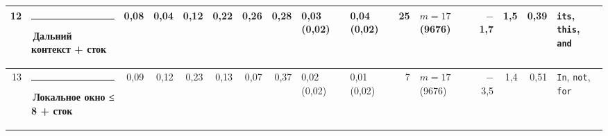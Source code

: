\documentclass[10pt]{article}
\begin{document}
\begin{minipage}{\linewidth}
\begin{center}
{\begin{tabular}{|r|l|r|r|r|r|r|r|l|l|r|l|r|r|r|l|}
12 & \textcolor[HTML]{C3C2B7}{\rule{0.62em}{0.62em}}\,Дальний контекст + сток & 0,08 & 0,04 & 0,12 & 0,22 & 0,26 & 0,28 & 0,03 (0,02) & 0,04 (0,02) & 25 & $m{=}17$ (9676) & $-$1,7 & 1,5 & 0,39 & \texttt{\textvisiblespace{}its}, \texttt{\textvisiblespace{}this}, \texttt{\textvisiblespace{}and} \\ \hline
13 & \textcolor[HTML]{1BAF7A}{\rule{0.62em}{0.62em}}\,\textbf{Локальное окно ≤ 8 + сток} & 0,09 & 0,12 & 0,23 & 0,13 & 0,07 & 0,37 & 0,02 (0,02) & 0,01 (0,02) & 7 & $m{=}17$ (9676) & $-$3,5 & 1,4 & 0,51 & \texttt{\textvisiblespace{}In}, \texttt{\textvisiblespace{}not}, \texttt{\textvisiblespace{}for} \\ \hline
\hline\end{tabular}}\end{center}
\end{minipage}
\par\vspace{0.4em}
\end{document}
